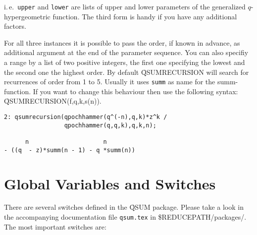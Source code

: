 \documentclass[11pt,letterpaper]{book}
\begin{document}
i.\,e.\ {\tt upper} and {\tt lower} are lists of upper and lower
parameters of the generalized $q$-hypergeometric function.
The third form is handy if you have any additional factors.

For all three instances it is possible to pass the order, if known
in advance, as additional argument at the end of the parameter sequence.
You can also specifiy a range by a list of two positive integers, the first
one specifying the lowest and the second one the highest order. By default
\f{QSUMRECURSION} will search for recurrences of order from 1 to 5. Usually
it uses {\tt summ} as name for the summ-function. If you want to change this
behaviour then use the following syntax: \f{QSUMRECURSION(f,q,k,s(n))}.

{\small\begin{verbatim}
2: qsumrecursion(qpochhammer(q^(-n),q,k)*z^k /
                 qpochhammer(q,q,k),q,k,n);

      n                     n
- ((q  - z)*summ(n - 1) - q *summ(n))
\end{verbatim}}

\section{Global Variables and Switches}

There are several switches defined in the \f{QSUM} package. Please take a
look in the accompanying documentation file {\tt qsum.tex} in
\$REDUCEPATH/packages/. \\

The most important switches are:
\end{document}
